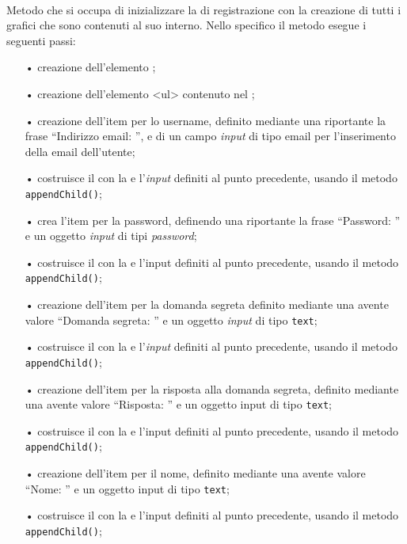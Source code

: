 \begin{description}
	\item{}\\
	Metodo che si occupa di inizializzare la  di registrazione con la creazione di tutti i  grafici che sono contenuti al suo interno. Nello specifico il metodo esegue i seguenti passi:
	\begin{itemize}
		\item[•] creazione dell'elemento ;
		\item[•] creazione dell'elemento <ul> contenuto nel ;		
		\item[•] creazione dell'item per lo username, definito mediante una  riportante la frase ``Indirizzo email: '', e di un campo \textit{input} di tipo email per l'inserimento della email dell'utente;
		\item[•] costruisce il  con la  e l'\textit{input} definiti al punto precedente, usando il metodo \texttt{appendChild()};
		\item[•] crea l'item per la password, definendo una  riportante la frase ``Password: '' e un oggetto \textit{input} di tipi \textit{password};			
		\item[•] costruisce il  con la  e l'input definiti al punto precedente, usando il metodo \texttt{appendChild()};
		\item[•] creazione dell'item per la domanda segreta definito mediante una  avente valore ``Domanda segreta: '' e un oggetto \textit{input} di tipo \texttt{text};
		\item[•] costruisce il  con la  e l'\textit{input} definiti al punto precedente, usando il metodo \texttt{appendChild()};
		\item[•] creazione dell'item per la risposta alla domanda segreta, definito mediante una  avente valore ``Risposta: '' e un oggetto input di tipo \texttt{text};
		\item[•] costruisce il  con la  e l'input definiti al punto precedente, usando il metodo \texttt{appendChild()};
		\item[•] creazione dell'item per il nome, definito mediante una  avente valore ``Nome: '' e un oggetto input di tipo \texttt{text};
		\item[•] costruisce il  con la  e l'input definiti al punto precedente, usando il metodo \texttt{appendChild()};

\end{itemize}
\end{description}
